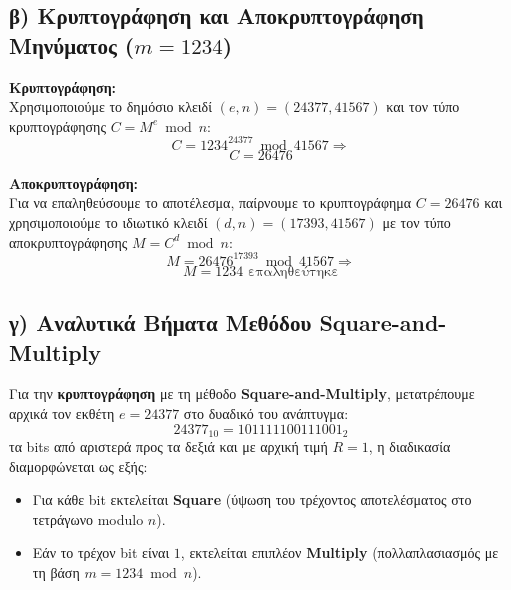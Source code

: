 \documentclass[12pt, a4paper]{article}
\begin{document}
\subsection*{β) Κρυπτογράφηση και Αποκρυπτογράφηση Μηνύματος ($m=1234$)}

\textbf{Κρυπτογράφηση:}\\
Χρησιμοποιούμε το δημόσιο κλειδί $(e, n) = (24377, 41567)$ και τον τύπο κρυπτογράφησης $C = M^e \bmod{n}$:
\[ C = 1234^{24377} \bmod{41567} \Rightarrow \]
\[ C = 26476 \]

\noindent \textbf{Αποκρυπτογράφηση:}\\
Για να επαληθεύσουμε το αποτέλεσμα, παίρνουμε το κρυπτογράφημα $C=26476$ και χρησιμοποιούμε το ιδιωτικό κλειδί $(d, n) = (17393, 41567)$ με τον τύπο αποκρυπτογράφησης $M = C^d \bmod{n}$:
\[ M = 26476^{17393} \bmod{41567} \Rightarrow \] 
\[ M = 1234 \texttt{ επαληθεύτηκε} \] 

\subsection*{γ) Αναλυτικά Βήματα Μεθόδου Square-and-Multiply}

Για την \textbf{κρυπτογράφηση} με τη μέθοδο \textbf{Square-and-Multiply}, μετατρέπουμε αρχικά τον εκθέτη $e=24377$ στο δυαδικό του ανάπτυγμα:
    \[24377_{10} = 101111100111001_{2}\]
 τα bits από αριστερά προς τα δεξιά και με αρχική τιμή $R = 1$, η διαδικασία διαμορφώνεται ως εξής:
\begin{itemize}
    \item Για κάθε bit εκτελείται \textbf{Square} (ύψωση του τρέχοντος αποτελέσματος στο τετράγωνο modulo $n$).
    \item Εάν το τρέχον bit είναι \textbf{$1$}, εκτελείται επιπλέον \textbf{Multiply} (πολλαπλασιασμός με τη βάση $m=1234\bmod{n}$).
\end{itemize}
\end{document}
